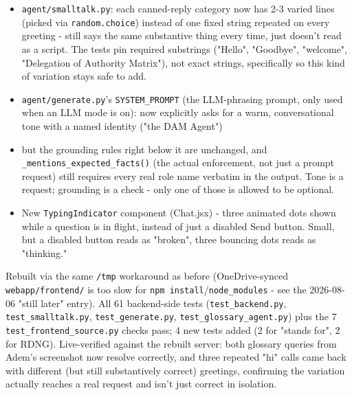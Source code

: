 \begin{itemize}
\item \texttt{agent/\allowbreak{}smalltalk.py}: each canned-reply category now has 2-3 varied lines (picked via \texttt{random.choice}) instead of one fixed string repeated on every greeting - still says the same substantive thing every time, just doesn't read as a script. The tests pin required substrings ("Hello", "Goodbye", "welcome", "Delegation of Authority Matrix"), not exact strings, specifically so this kind of variation stays safe to add.
\item \texttt{agent/\allowbreak{}generate.py}'s \texttt{SYSTEM\_\allowbreak{}PROMPT} (the LLM-phrasing prompt, only used when an LLM mode is on): now explicitly asks for a warm, conversational tone with a named identity ("the DAM Agent")
\item but the grounding rules right below it are unchanged, and \texttt{\_\allowbreak{}mentions\_\allowbreak{}expected\_\allowbreak{}facts()} (the actual enforcement, not just a prompt request) still requires every real role name verbatim in the output. Tone is a request; grounding is a check - only one of those is allowed to be optional.
\item New \texttt{TypingIndicator} component (Chat.jsx) - three animated dots shown while a question is in flight, instead of just a disabled Send button. Small, but a disabled button reads as "broken", three bouncing dots reads as "thinking."
\end{itemize}
Rebuilt via the same \texttt{/\allowbreak{}tmp} workaround as before (OneDrive-synced \texttt{webapp/\allowbreak{}frontend/\allowbreak{}} is too slow for \texttt{npm install}/\texttt{node\_\allowbreak{}modules} - see the 2026-08-06 "still later" entry). All 61 backend-side tests (\texttt{test\_\allowbreak{}backend.py}, \texttt{test\_\allowbreak{}smalltalk.py}, \texttt{test\_\allowbreak{}generate.py}, \texttt{test\_\allowbreak{}glossary\_\allowbreak{}agent.py}) plus the 7 \texttt{test\_\allowbreak{}frontend\_\allowbreak{}source.py} checks pass; 4 new tests added (2 for "stands for", 2 for RDNG). Live-verified against the rebuilt server: both glossary queries from Adem's screenshot now resolve correctly, and three repeated "hi" calls came back with different (but still substantively correct) greetings, confirming the variation actually reaches a real request and isn't just correct in isolation.

